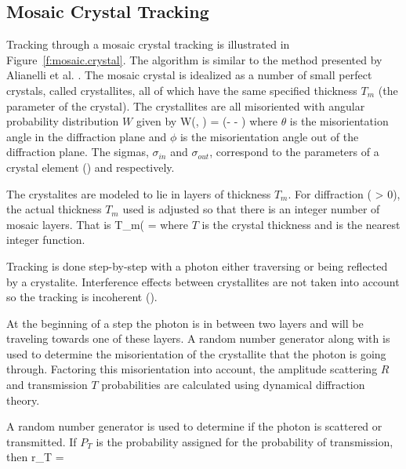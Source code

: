 \subsection{Mosaic Crystal Tracking}
\label{s:mosaic.track}

Tracking through a mosaic crystal tracking is illustrated in Figure~\ref{f:mosaic.crystal}. The
\bmad algorithm is similar to the method presented by Alianelli et al. \cite{b:mosaic}. The mosaic
crystal is idealized as a number of small perfect crystals, called crystallites, all of which have
the same specified thickness $T_m$ (the  parameter of the crystal). The
crystallites are all misoriented with angular probability distribution $W$ given by
\Begineq
  W(\theta, \phi) =  \exp \left(-
   -  \right)
  \label{w12p}
\Endeq
where $\theta$ is the misorientation angle in the diffraction plane and $\phi$ is the misorientation
angle out of the diffraction plane. The sigmas, $\sigma_{in}$ and $\sigma_{out}$, correspond to the
parameters of a crystal element ()  and
 respectively.

The crystalites are modeled to lie in layers of thickness $T_m$. For  diffraction
( > 0), the actual thickness $T_m$ used is adjusted so that there is an integer number
of mosaic layers. That is
\Begineq
  T_m( = 
\Endeq
where $T$ is the crystal thickness and  is the nearest integer function. 

Tracking is done step-by-step with a photon either traversing or being reflected by a crystalite.
Interference effects between crystallites are not taken into account so the tracking is incoherent
().

At the beginning of a step the photon is in between two layers and will be traveling towards one of
these layers. A random number generator along with  is used to determine the misorientation
of the crystallite that the photon is going through. Factoring this misorientation into account, the
amplitude scattering $R$ and transmission $T$ probabilities are calculated using dynamical diffraction theory.

A random number generator is used to determine if the photon is scattered or transmitted. If $P_T$ is the
probability assigned for the probability of transmission, then
\Begineq
  r_T = 
\Endeq

